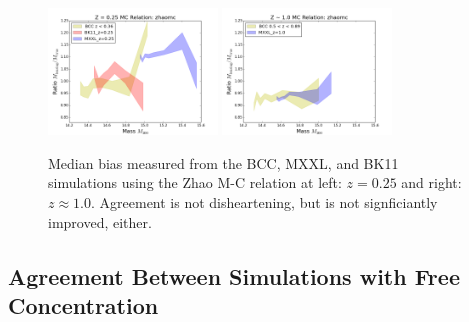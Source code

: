 \documentclass[11pt]{article}
\begin{document}
\begin{figure} \centering
\includegraphics[width=0.4\textwidth]{figures/zhaomc_z25.png}
\includegraphics[width=0.4\textwidth]{figures/zhaomc_z10.png}
\caption{Median bias measured from the BCC, MXXL, and BK11 simulations using the Zhao M-C relation at left: $z=0.25$ and right: $z\approx 1.0$. Agreement is not disheartening, but is not signficiantly improved, either.}
\label{fig:zhamoc}

\end{figure}





\subsection{Agreement Between Simulations with Free Concentration}
\label{sec:consistancy}
\end{document}
